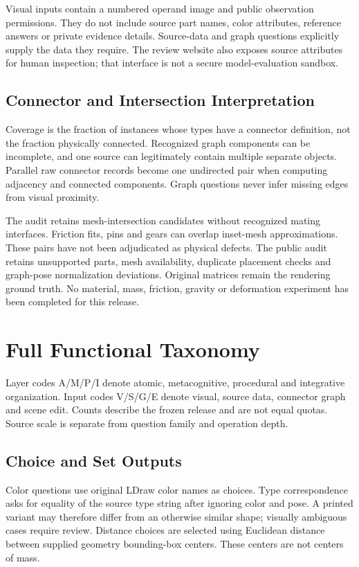 \documentclass[10pt,letterpaper]{article}
\begin{document}
Visual inputs contain a numbered operand image and public observation
permissions. They do not include source part names, color attributes,
reference answers or private evidence details. Source-data and graph
questions explicitly supply the data they require. The review website
also exposes source attributes for human inspection; that interface is
not a secure model-evaluation sandbox.

\subsection{Connector and Intersection Interpretation}
Coverage is the fraction of instances whose types have a connector
definition, not the fraction physically connected. Recognized graph
components can be incomplete, and one source can legitimately contain
multiple separate objects. Parallel raw connector records become one
undirected pair when computing adjacency and connected components.
Graph questions never infer missing edges from visual proximity.

The audit retains \LDrawIntersections{} mesh-intersection candidates
without recognized mating interfaces. Friction fits, pins and gears
can overlap inset-mesh approximations. These pairs have not been
adjudicated as physical defects. The public audit retains unsupported
parts, mesh availability, duplicate placement checks and graph-pose
normalization deviations. Original matrices remain the rendering
ground truth. No material, mass, friction, gravity or deformation
experiment has been completed for this release.

\section{Full Functional Taxonomy}
\begin{center}\small\end{center}
Layer codes A/M/P/I denote atomic, metacognitive, procedural and
integrative organization. Input codes V/S/G/E denote visual, source
data, connector graph and scene edit. Counts describe the frozen
release and are not equal quotas. Source scale is separate from
question family and operation depth.

\subsection{Choice and Set Outputs}
Color questions use original LDraw color names as choices. Type
correspondence asks for equality of the source type string after
ignoring color and pose. A printed variant may therefore differ from
an otherwise similar shape; visually ambiguous cases require review.
Distance choices are selected using Euclidean distance between supplied
geometry bounding-box centers. These centers are not centers of mass.
\end{document}
